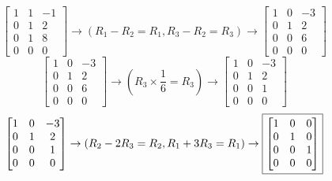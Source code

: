 \documentclass[letterpaper]{report}
\begin{document}
\[ 
\begin{bmatrix} 
    1 & 1 & -1 \\
    0 & 1 & 2 \\
    0 & 1 & 8 \\
    0 & 0 & 0 
\end{bmatrix} 
    \to (R_1 - R_2 = R_1, R_3-R_2 = R_3) \to  
\begin{bmatrix} 
    1 & 0 & -3 \\
    0 & 1 & 2 \\
    0 & 0 & 6 \\
    0 & 0 & 0
\end{bmatrix} 
\] 
\[
\begin{bmatrix} 
    1 & 0 & -3 \\
    0 & 1 & 2 \\
    0 & 0 & 6 \\
    0 & 0 & 0
\end{bmatrix} 
    \to (R_3 \times \frac{1}{6} = R_3) \to 
    \begin{bmatrix} 
        1 & 0 & -3 \\
        0 & 1 & 2 \\
        0 & 0 & 1 \\
        0 & 0 & 0
    \end{bmatrix} 
\] 
\[
    \begin{bmatrix} 
        1 & 0 & -3 \\
        0 & 1 & 2 \\
        0 & 0 & 1 \\
        0 & 0 & 0
    \end{bmatrix} 
    \to (R_2 - 2R_3 = R_2, R_1 + 3R_3 = R_1) \to 
    \fbox{$
    \begin{bmatrix} 
        1 & 0 & 0 \\
        0 & 1 & 0 \\
        0 & 0 & 1 \\
        0 & 0 & 0
\end{bmatrix} $}
\] 
\end{document}
